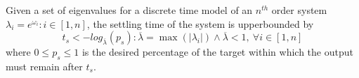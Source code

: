 \documentclass[sigconf]{llncs}
\begin{document}
\begin{theorem}
Given a set of eigenvalues for a discrete time model of an $n^{th}$ order system $\lambda_i =e^{\omega_i}: i \in [1, n]$, the settling time of the system is upperbounded by
\begin{equation}
t_s<-log_{\overline{\lambda}}({p_s}) : \overline{\lambda} = \max(|\lambda_i|) \wedge \overline{\lambda}<1,\ \forall i \in [1, n]
\label{eq:set_time}
\end{equation}
where $0\leq p_s \leq 1$ is the desired percentage of the target within which the output must remain after $t_s$.
\end{theorem}
\end{document}
